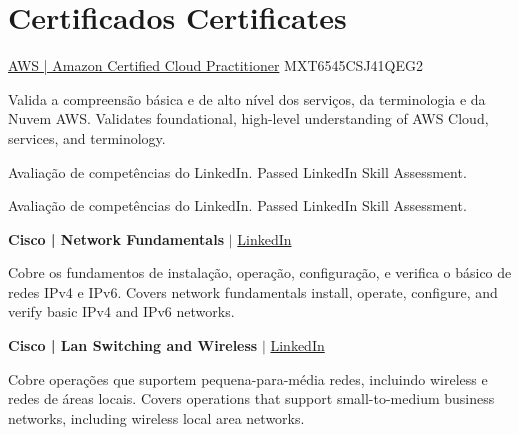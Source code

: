 \section{
    {Certificados}
    {Certificates}
  }
  \vspace{3pt}
  \resumeSubHeadingListStart

    \resumeSubheading
      {\href{https://aw.certmetrics.com/amazon/public/verification.aspx}{\color{blue}AWS | Amazon Certified Cloud Practitioner} MXT6545CSJ41QEG2}%

      {%
          {Valida a compreensão básica e de alto nível dos serviços, da terminologia e da Nuvem AWS.}
          {Validates foundational, high-level understanding of AWS Cloud, services, and terminology.}
      }{}


    \resumeSubheading
      {\href{https://linkedin.com/in/rafaeldutra}{}}%

      {%
          {Avaliação de competências do LinkedIn.}
          {Passed LinkedIn Skill Assessment.}
      }{}

    \resumeSubheading
      {\href{https://linkedin.com/in/rafaeldutra}{}}

      {%
          {Avaliação de competências do LinkedIn.}
          {Passed LinkedIn Skill Assessment.}
      }{}

    \resumeSubheading
      {\textbf{Cisco | Network Fundamentals} $|$ \href{https://linkedin.com/in/rafaeldutra}{\color{blue}LinkedIn}}

      {%
          {Cobre os fundamentos de instalação, operação, configuração, e verifica o básico de redes IPv4 e IPv6.}
          {Covers network fundamentals install, operate, configure, and verify basic IPv4 and IPv6 networks.}
      }{}

    \resumeSubheading
      {\textbf{Cisco | Lan Switching and Wireless} $|$ \href{https://linkedin.com/in/rafaeldutra}{\color{blue}LinkedIn}}

      {%
          {Cobre operações que suportem pequena-para-média redes, incluindo wireless e redes de áreas locais.}
          {Covers operations that support small-to-medium business networks, including wireless local area networks.}
      }{}

  \resumeSubHeadingListEnd
